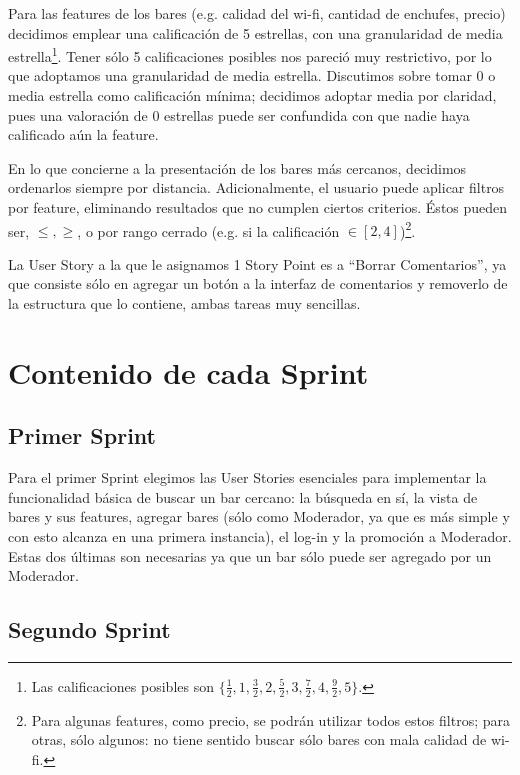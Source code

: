 \documentclass[hidelinks,a4paper,11pt, nofootinbib]{article}
\begin{document}
\par Para las features de los bares (e.g. calidad del wi-fi, cantidad de enchufes, precio) decidimos emplear una calificación de 5 estrellas, con una granularidad de media estrella\footnote{Las calificaciones posibles son $\{ \frac{1}{2}, 1, \frac{3}{2}, 2, \frac{5}{2}, 3, \frac{7}{2}, 4, \frac{9}{2}, 5 \}$.}.
Tener sólo 5 calificaciones posibles nos pareció muy restrictivo, por lo que adoptamos una granularidad de media estrella.
Discutimos sobre tomar 0 o media estrella como calificación mínima; decidimos adoptar media por claridad, pues una valoración de 0 estrellas puede ser confundida con que nadie haya calificado aún la feature.

\par En lo que concierne a la presentación de los bares más cercanos, decidimos ordenarlos siempre por distancia.
Adicionalmente, el usuario puede aplicar filtros por feature, eliminando resultados que no cumplen ciertos criterios. 
Éstos pueden ser, $\leqslant, \geqslant$, o por rango cerrado (e.g. si la calificación $\in [2, 4]$)\footnote{Para algunas features, como precio, se podrán utilizar todos estos filtros; para otras, sólo algunos: no tiene sentido buscar sólo bares con mala calidad de wi-fi.}.

\par La User Story a la que le asignamos 1 Story Point es a ``Borrar Comentarios'', ya que consiste sólo en agregar un botón a la interfaz de comentarios y removerlo de la estructura que lo contiene, ambas tareas muy sencillas.

\section{Contenido de cada Sprint}

\subsection{Primer Sprint}

\par Para el primer Sprint elegimos las User Stories esenciales para implementar la funcionalidad básica de buscar un bar cercano: la búsqueda en sí, la vista de bares y sus features, agregar bares (sólo como Moderador, ya que es más simple y con esto alcanza en una primera instancia), el log-in y la promoción a Moderador.
Estas dos últimas son necesarias ya que un bar sólo puede ser agregado por un Moderador.

\subsection{Segundo Sprint}
\end{document}

